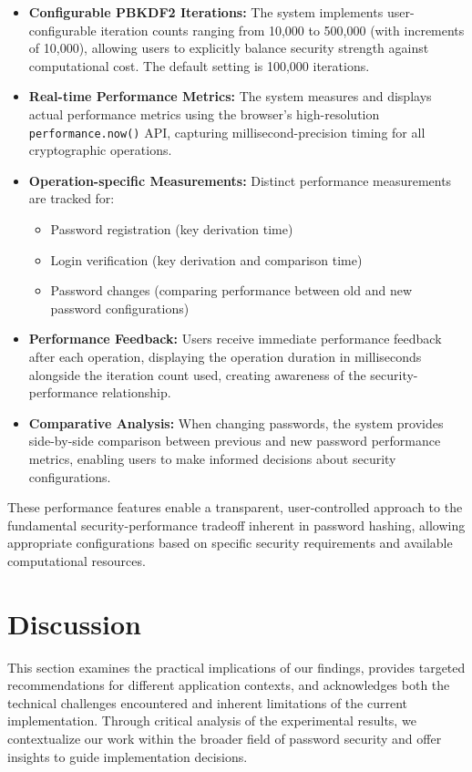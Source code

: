 \documentclass[11pt,a4paper]{article}
\begin{document}
\begin{itemize}
    \item \textbf{Configurable PBKDF2 Iterations:} The system implements user-configurable iteration counts ranging from 10,000 to 500,000 (with increments of 10,000), allowing users to explicitly balance security strength against computational cost. The default setting is 100,000 iterations.
    
    \item \textbf{Real-time Performance Metrics:} The system measures and displays actual performance metrics using the browser's high-resolution \texttt{performance.now()} API, capturing millisecond-precision timing for all cryptographic operations.
    
    \item \textbf{Operation-specific Measurements:} Distinct performance measurements are tracked for:
    \begin{itemize}
        \item Password registration (key derivation time)
        \item Login verification (key derivation and comparison time)
        \item Password changes (comparing performance between old and new password configurations)
    \end{itemize}
    
    \item \textbf{Performance Feedback:} Users receive immediate performance feedback after each operation, displaying the operation duration in milliseconds alongside the iteration count used, creating awareness of the security-performance relationship.
    
    \item \textbf{Comparative Analysis:} When changing passwords, the system provides side-by-side comparison between previous and new password performance metrics, enabling users to make informed decisions about security configurations.
\end{itemize}

These performance features enable a transparent, user-controlled approach to the fundamental security-performance tradeoff inherent in password hashing, allowing appropriate configurations based on specific security requirements and available computational resources.
\section{Discussion}
This section examines the practical implications of our findings, provides targeted recommendations for different application contexts, and acknowledges both the technical challenges encountered and inherent limitations of the current implementation. Through critical analysis of the experimental results, we contextualize our work within the broader field of password security and offer insights to guide implementation decisions.
\end{document}
